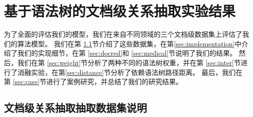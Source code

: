 \documentclass[bachelor]{thesis-uestc}
\begin{document}
\chapter{基于语法树的文档级关系抽取实验结果}
为了全面的评估我们的模型，我们在来自不同领域的三个文档级数据集上评估了我们的算法模型。
我们在第 \ref{sec:dataset}节介绍了这些数据集，在第\ref{sec:implementation}中介绍了我们的实现细节，在第 \ref{sec:docred}和 \ref{sec:medical}节说明了我们的结果。
然后，我们在第 \ref{sec:weight}节分析了两种不同的语法树权重，并在第 \ref{sec:inter}节进行了消融实验，在第\ref{sec:distance}节分析了依赖语法树路径距离。
最后，我们在第 \ref{sec:case}节进行了案例研究，并总结了我们的研究结果。

\section{文档级关系抽取抽取数据集说明}\label{sec:dataset}
\end{document}
